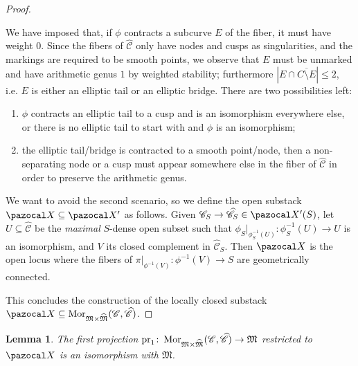 \documentclass[11pt]{amsart}
\renewcommand{\to}{\rightarrow}
\newcommand{\pr}{\rm{pr}}
\newcommand{\X}{\pazocal X}
\newcommand{\cC}{\mathcal C}
\newcommand{\hC}{\widehat{\mathcal C}}
\newcommand{\MM}{\mathfrak M}
\newcommand{\hM}{\widehat{\mathfrak M}}
\theoremstyle{plain}
\newtheorem{lem}[thm]{Lemma}
\theoremstyle{definition}
\begin{document}
\begin{proof}
\begin{description}[labelindent=0cm,leftmargin=\parindent]
\item[Step 4] We have imposed that, if $\phi$ contracts a subcurve $E$ of the fiber, it must have weight $0$. Since the fibers of $\hC$ only have nodes and cusps as singularities, and the markings are required to be smooth points, we observe that $E$ must be unmarked and have arithmetic genus $1$ by weighted stability; furthermore $\left|E\cap\overline{C\setminus E}\right|\leq 2$, i.e. $E$ is either an elliptic tail or an elliptic bridge. There are two possibilities left:
\begin{enumerate}
\item $\phi$ contracts an elliptic tail to a cusp and is an isomorphism everywhere else, or there is no elliptic tail to start with and $\phi$ is an isomorphism;
\item the elliptic tail/bridge is contracted to a smooth point/node, then a non-separating node or a cusp must appear somewhere else in the fiber of $\hC$ in order to preserve the arithmetic genus.
\end{enumerate} 
We want to avoid the second scenario, so we define the open substack $\X\subseteq \X'$ as follows.
Given $\mathcal{C}_S\to\hC_S\in\X'(S)$, let $U\subseteq \hC$ be the \emph{maximal} $S$-dense open subset such that $\phi_S|_{\phi_S^{-1}(U)}\colon\phi_S^{-1}(U)\to U$ is an isomorphism, and $V$ its closed complement in $\hC_S$. 
Then $\X$ is the open locus \cite[\href{http://stacks.math.columbia.edu/tag/055G}{Tag 055G}]{stacks-project} where the fibers of $\pi|_{\phi^{-1}(V)}\colon \phi^{-1}(V)\to S$ are geometrically connected.
\end{description} 
This concludes the construction of the locally closed substack $\X\subseteq \operatorname{Mor}_{\MM\times\hM}(\cC,\hC)$.
 \end{proof}
 
 
\begin{lem}\label{lamma:projection_iso}
 The first projection $\pr_1\colon \operatorname{Mor}_{\MM\times\hM}(\cC,\hC)\to\MM$ restricted to $\X$ is an isomorphism with $\MM$.
\end{lem}
\end{document}
